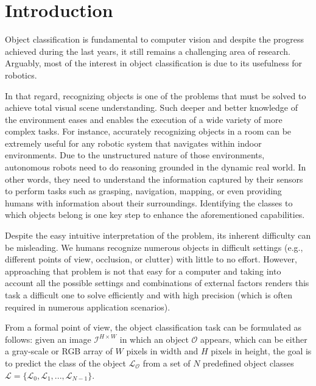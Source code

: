 \section{Introduction}
\label{cha:objrecog:sec:introduction}

Object classification is fundamental to computer vision and despite the progress achieved during the last years, it still remains a challenging area of research. Arguably, most of the interest in object classification is due to its usefulness for robotics.

In that regard, recognizing objects is one of the problems that must be solved to achieve total visual scene understanding. Such deeper and better knowledge of the environment eases and enables the execution of a wide variety of more complex tasks. For instance, accurately recognizing objects in a room can be extremely useful for any robotic system that navigates within indoor environments. Due to the unstructured nature of those environments, autonomous robots need to do reasoning grounded in the dynamic real world. In other words, they need to understand the information captured by their sensors to perform tasks such as grasping, navigation, mapping, or even providing humans with information about their surroundings. Identifying the classes to which objects belong is one key step to enhance the aforementioned capabilities.

Despite the easy intuitive interpretation of the problem, its inherent difficulty can be misleading. We humans recognize numerous objects in difficult settings (e.g., different points of view, occlusion, or clutter) with little to no effort. However, approaching that problem is not that easy for a computer and taking into account all the possible settings and combinations of external factors renders this task a difficult one to solve efficiently and with high precision (which is often required in numerous application scenarios).

From a formal point of view, the object classification task can be formulated as follows: given an image $\mathcal{I}^{H\times W}$ in which an object $\mathcal{O}$ appears, which can be either a gray-scale or RGB array of $W$ pixels in width and $H$ pixels in height, the goal is to predict the class of the object $\mathcal{L_O}$ from a set of $N$ predefined object classes $\mathcal{L} = \{\mathcal{L}_0, \mathcal{L}_1, ..., \mathcal{L}_{N-1}\}$.

